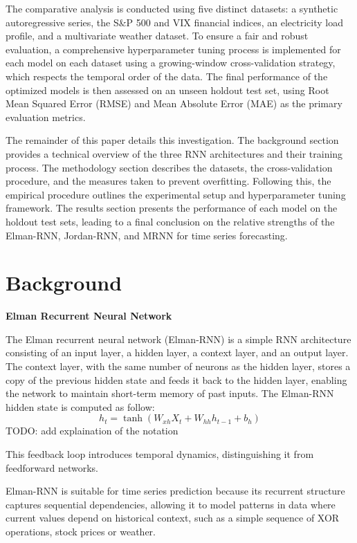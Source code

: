 \documentclass[conference, 10pt]{IEEEtran}
\begin{document}
The comparative analysis is conducted using five distinct datasets: a synthetic autoregressive series, the S\&P 500 and
VIX financial indices, an electricity load profile, and a multivariate weather dataset. To ensure a fair and robust
evaluation, a comprehensive hyperparameter tuning process is implemented for each model on each dataset using a
growing-window cross-validation strategy, which respects the temporal order of the data. The final performance of the
optimized models is then assessed on an unseen holdout test set, using Root Mean Squared Error (RMSE) and Mean Absolute
Error (MAE) as the primary evaluation metrics.

The remainder of this paper details this investigation. The background section provides a technical overview of the
three RNN architectures and their training process. The methodology section describes the datasets, the cross-validation
procedure, and the measures taken to prevent overfitting. Following this, the empirical procedure outlines the
experimental setup and hyperparameter tuning framework. The results section presents the performance of each model on
the holdout test sets, leading to a final conclusion on the relative strengths of the Elman-RNN, Jordan-RNN, and MRNN
for time series forecasting.


\section{Background}

\textbf{Elman Recurrent Neural Network }

The Elman recurrent neural network (Elman-RNN) is a simple RNN architecture consisting of an input layer, a hidden
layer, a context layer, and an output layer. The context layer, with the same number of neurons as the hidden layer,
stores a copy of the previous hidden state and feeds it back to the hidden layer, enabling the network to maintain
short-term memory of past inputs. 
The Elman-RNN hidden state is computed as follow:
$$h_t = \tanh(W_{xh}X_t + W_{hh}h_{t-1} + b_h)$$
TODO: add explaination of the notation

This feedback loop introduces temporal dynamics, distinguishing it from feedforward
networks.

Elman-RNN is suitable for time series prediction because its recurrent structure captures sequential dependencies,
allowing it to model patterns in data where current values depend on historical context, such as a simple sequence of
XOR operations, stock prices or weather.
\end{document}
